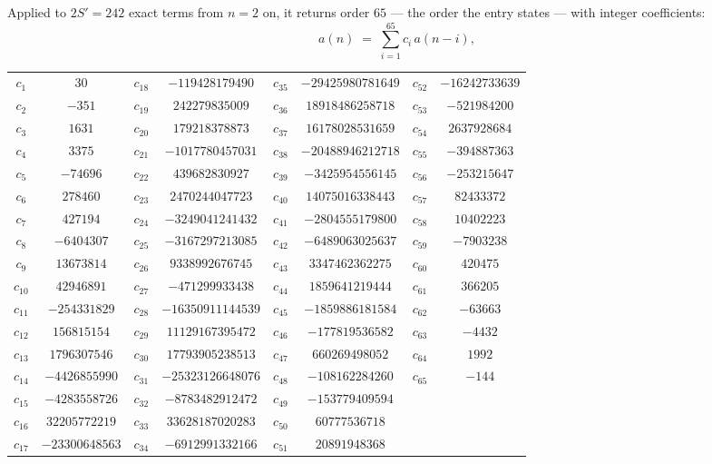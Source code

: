 \documentclass[11pt,a4paper]{article}
\theoremstyle{plain}
\theoremstyle{definition}
\begin{document}
Applied to $2S'=242$ exact terms from $n=2$ on, it returns order $65$ --- the
order the entry states --- with integer coefficients:
\[
a(n)\;=\;\sum_{i=1}^{65}c_i\,a(n-i),
\]
\begin{center}\small
\begin{tabular}{cccccccc}
$c_{1}$ & $30$ & $c_{18}$ & $-119428179490$ & $c_{35}$ & $-29425980781649$ & $c_{52}$ & $-16242733639$ \\
$c_{2}$ & $-351$ & $c_{19}$ & $242279835009$ & $c_{36}$ & $18918486258718$ & $c_{53}$ & $-521984200$ \\
$c_{3}$ & $1631$ & $c_{20}$ & $179218378873$ & $c_{37}$ & $16178028531659$ & $c_{54}$ & $2637928684$ \\
$c_{4}$ & $3375$ & $c_{21}$ & $-1017780457031$ & $c_{38}$ & $-20488946212718$ & $c_{55}$ & $-394887363$ \\
$c_{5}$ & $-74696$ & $c_{22}$ & $439682830927$ & $c_{39}$ & $-3425954556145$ & $c_{56}$ & $-253215647$ \\
$c_{6}$ & $278460$ & $c_{23}$ & $2470244047723$ & $c_{40}$ & $14075016338443$ & $c_{57}$ & $82433372$ \\
$c_{7}$ & $427194$ & $c_{24}$ & $-3249041241432$ & $c_{41}$ & $-2804555179800$ & $c_{58}$ & $10402223$ \\
$c_{8}$ & $-6404307$ & $c_{25}$ & $-3167297213085$ & $c_{42}$ & $-6489063025637$ & $c_{59}$ & $-7903238$ \\
$c_{9}$ & $13673814$ & $c_{26}$ & $9338992676745$ & $c_{43}$ & $3347462362275$ & $c_{60}$ & $420475$ \\
$c_{10}$ & $42946891$ & $c_{27}$ & $-471299933438$ & $c_{44}$ & $1859641219444$ & $c_{61}$ & $366205$ \\
$c_{11}$ & $-254331829$ & $c_{28}$ & $-16350911144539$ & $c_{45}$ & $-1859886181584$ & $c_{62}$ & $-63663$ \\
$c_{12}$ & $156815154$ & $c_{29}$ & $11129167395472$ & $c_{46}$ & $-177819536582$ & $c_{63}$ & $-4432$ \\
$c_{13}$ & $1796307546$ & $c_{30}$ & $17793905238513$ & $c_{47}$ & $660269498052$ & $c_{64}$ & $1992$ \\
$c_{14}$ & $-4426855990$ & $c_{31}$ & $-25323126648076$ & $c_{48}$ & $-108162284260$ & $c_{65}$ & $-144$ \\
$c_{15}$ & $-4283558726$ & $c_{32}$ & $-8783482912472$ & $c_{49}$ & $-153779409594$ &  &  \\
$c_{16}$ & $32205772219$ & $c_{33}$ & $33628187020283$ & $c_{50}$ & $60777536718$ &  &  \\
$c_{17}$ & $-23300648563$ & $c_{34}$ & $-6912991332166$ & $c_{51}$ & $20891948368$ &  &  \\
\end{tabular}
\end{center}
\end{document}
